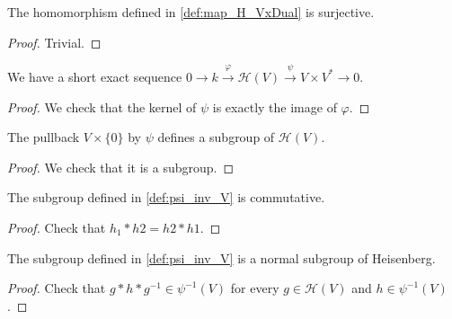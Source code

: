 \begin{proposition}
    \label{prop:surj_map_H_VxDual}
    \leanok 

    The homomorphism defined in \ref{def:map_H_VxDual} is surjective.
\end{proposition}
\begin{proof}
    \leanok
    Trivial.
\end{proof}

\begin{proposition}
    \label{exact_seq_h}
    \leanok 

    We have a short exact sequence $0\rightarrow k \stackrel{\varphi}{\rightarrow} \mathcal{H}(V) \stackrel{\psi}{\rightarrow}
    V\times V^* \rightarrow 0$.
\end{proposition}
\begin{proof}
    \leanok
    We check that the kernel of $\psi$ is exactly the image of $\varphi$.
\end{proof}

\begin{definition}[$\psi^{-1}(V)$]
    \label{def:psi_inv_V}
    \leanok 

    The pullback $V\times\{0\}$ by $\psi$ defines a subgroup of $\mathcal{H}(V)$.
    \begin{proof}
        \leanok
        We check that it is a subgroup.
    \end{proof}
\end{definition}

\begin{proposition}
    \label{prop:psi_inv_V_comm}
    \leanok

    The subgroup defined in \ref{def:psi_inv_V} is commutative.
\end{proposition}
\begin{proof}
    \leanok
    Check that $h_1*h2=h2*h1$.
\end{proof}

\begin{proposition}
    \label{prop:psi_inv_V_normal}
    \leanok

    The subgroup defined in \ref{def:psi_inv_V} is a normal subgroup of Heisenberg.
\end{proposition}
\begin{proof}
    \leanok 
    Check that $g*h*g^{-1}\in \psi^{-1}(V)$ for every $g\in \mathcal{H}(V)$ and $h\in \psi^{-1}(V)$.
\end{proof}

